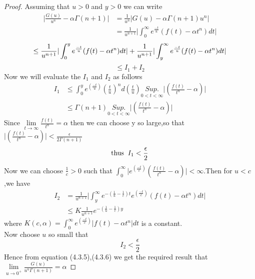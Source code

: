 \begin{proof}
 Assuming that $ u>0 $ and $ y>0 $ we can write
 \begin{align*}
\vert {\frac{G(u)}{u^{n}}-\alpha\Gamma(n+1)}\vert &=\frac{1}{u^{n}}\vert {G(u)-\alpha\Gamma(n+1)u^{n}}\vert\\
&=\frac{1}{u^{n+1}}\vert\int_{0}^{\infty}e^{\frac{-t}{u}}(f(t)-\alpha t^{n})dt\vert
\end{align*}
\begin{equation*}
\leq \frac{1}{u^{n+1}}\vert\int_{0}^{y}e^{\frac{-t}{u}}(f(t)-\alpha t^{n})dt\vert + \frac{1}{u^{n+1}}\vert\int_{y}^{\infty}e^{\frac{-t}{u}}(f(t)-\alpha t^{n})dt\vert\\
\end{equation*}
\begin{equation*}
\leq I_{1} + I_{2}
\end{equation*}
Now we will evaluate the $ I_{1} $ and $ I_{2} $ as follows
\begin{align*}
I_{1}&\leq \int_{0}^{y}e^{(\frac{-t}{u})}(\frac{t}{u})^{n}d(\frac{t}{u})\underset{0<t<\infty}{Sup.}\vert(\frac{f(t)}{t^{n}}-\alpha )\vert\\
&\leq \Gamma(n+1)\underset{0<t<\infty}{Sup.}\vert(\frac{f(t)}{t^{n}}-\alpha )\vert
\end{align*}
Since $\underset{t\rightarrow \infty}\lim \frac{f(t)}{t^{n}}=\alpha$ then we can choose y so large,so that $ \vert(\frac{f(t)}{t^{n}}-\alpha )\vert < \frac{\epsilon}{2\Gamma(n+1)} $ \\
\begin{equation}
\text{thus}\hspace{0.2cm} I_{1} <\frac{\epsilon}{2}
\end{equation}
Now we can choose $ \frac{1}{c} > 0 $ such that $ \int_{0}^{\infty}\vert e^{(\frac{-t}{c})}(\frac{f(t)}{t^{n}}-\alpha)\vert < \infty $.Then for $ u<c $,we have\\
\begin{align*}
I_{2}&=\frac{1}{u^{n+1}}\vert\int_{y}^{\infty}e^{-(\frac{1}{u}-\frac{1}{c})t}e^{(\frac{-t}{c})}(f(t)-\alpha t^{n})dt\vert\\
&\leq K \frac{1}{u^{n+1}}e^{-(\frac{1}{u}-\frac{1}{c})y}
\end{align*}
where $ K(c,\alpha) = \int_{0}^{\infty} e^{(\frac{-t}{c})}\vert f(t)-\alpha t^{n}\vert dt $ is a constant.\\
Now choose $ u $ so small that 
\begin{equation}
I_{2} < \frac{\epsilon}{2} 
\end{equation}
Hence from equation (4.3.5),(4.3.6) we get the required result that
$\underset{u\rightarrow 0^{+}}\lim \frac{G(u)}{u^{n}\Gamma(n+1)}=\alpha$
\end{proof}
